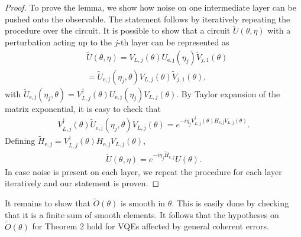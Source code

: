 \documentclass[letterpaper, 10 pt]{IEEEtran}  %
\begin{document}
\begin{proof}
   To prove the lemma, we show how noise on one intermediate layer can be pushed onto the observable. The statement follows by iteratively repeating the procedure
   over the circuit. 
   It is possible to show that a circuit $\tilde{U}(\theta, \eta)$ with a perturbation acting up to the $j$-th layer can be represented as
   \begin{align}
      & \tilde{U}(\theta, \eta) =V_{L,j}(\theta)U_{\mathrm{e,j}}(\eta_j)\tilde{V}_{j,1}(\theta) \nonumber \\
      & = \tilde{U}_{\mathrm{e,j}}(\eta_j, \theta) V_{L,j}(\theta)\tilde{V}_{j,1}(\theta), 
   \end{align} 
   with $\tilde{U}_{\mathrm{e,j}}(\eta_j, \theta)  =V^\dagger_{L,j}(\theta) U_{\mathrm{e,j}}(\eta_j) V_{L,j}(\theta)$.
   By Taylor expansion of the matrix exponential, it is easy to check that 
   \begin{align}
      V^\dagger_{L,j}(\theta) \tilde{U}_{\mathrm{e,j}}(\eta_j, \theta) V_{L,j}(\theta)=e^{-i \eta_j V^\dagger_{L,j}(\theta) H_{\mathrm{e,j}}V_{L,j}(\theta)}.   
   \end{align}
   Defining $\tilde{H}_{\mathrm{e},j}=V^\dagger_{L,j}(\theta) H_{\mathrm{e,j}}V_{L,j}(\theta)$,
   \begin{align}
      \tilde{U}(\theta, \eta) =e^{-i \eta_j \tilde{H}_{\mathrm{e},j}} U(\theta).
   \end{align}
   In case noise is present on each layer, we repeat the procedure for each layer iteratively and our statement is proven.
\end{proof}
It remains to show that $\tilde{O}(\theta)$ is smooth in $\theta$. This is easily done by checking that it is a finite sum of smooth elements.
It follows that the hypotheses on $\tilde{O}(\theta)$ for Theorem 2 hold for VQEs affected by general coherent errors.
\end{document}
